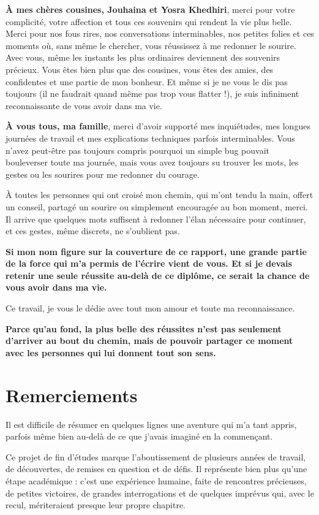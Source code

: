 \textbf{À mes chères cousines, Jouhaina et Yosra Khedhiri}, merci pour votre complicité, votre affection et tous ces souvenirs qui rendent la vie plus belle. Merci pour nos fous rires, nos conversations interminables, nos petites folies et ces moments où, sans même le chercher, vous réussissez à me redonner le sourire. Avec vous, même les instants les plus ordinaires deviennent des souvenirs précieux. Vous êtes bien plus que des cousines, vous êtes des amies, des confidentes et une partie de mon bonheur. Et même si je ne vous le dis pas toujours (il ne faudrait quand même pas trop vous flatter !), je suis infiniment reconnaissante de vous avoir dans ma vie.

\textbf{À vous tous, ma famille}, merci d’avoir supporté mes inquiétudes, mes longues journées de travail et mes explications techniques parfois interminables. Vous n’avez peut-être pas toujours compris pourquoi un simple bug pouvait bouleverser toute ma journée, mais vous avez toujours su trouver les mots, les gestes ou les sourires pour me redonner du courage.

À toutes les personnes qui ont croisé mon chemin, qui m’ont tendu la main, offert un conseil, partagé un sourire ou simplement encouragée au bon moment, merci. Il arrive que quelques mots suffisent à redonner l’élan nécessaire pour continuer, et ces gestes, même discrets, ne s’oublient pas.

\textbf{Si mon nom figure sur la couverture de ce rapport, une grande partie de la force qui m’a permis de l’écrire vient de vous. Et si je devais retenir une seule réussite au-delà de ce diplôme, ce serait la chance de vous avoir dans ma vie.}

Ce travail, je vous le dédie avec tout mon amour et toute ma reconnaissance.

\textbf{Parce qu’au fond, la plus belle des réussites n’est pas seulement d’arriver au bout du chemin, mais de pouvoir partager ce moment avec les personnes qui lui donnent tout son sens.}


\section*{Remerciements}

Il est difficile de résumer en quelques lignes une aventure qui m’a tant appris, parfois même bien au-delà de ce que j’avais imaginé en la commençant.

Ce projet de fin d’études marque l’aboutissement de plusieurs années de travail, de découvertes, de remises en question et de défis. Il représente bien plus qu’une étape académique : c’est une expérience humaine, faite de rencontres précieuses, de petites victoires, de grandes interrogations et de quelques imprévus qui, avec le recul, mériteraient presque leur propre chapitre.

